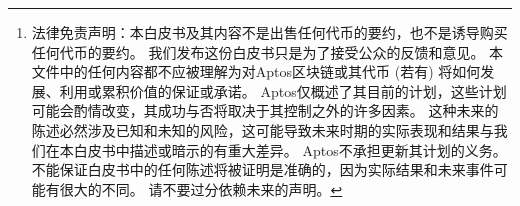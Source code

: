 \documentclass{article}
\begin{document}
\begin{abstract}
随着全新的互联网基础设施区块链的崛起，开发者正以飞快的速度部署着数以万计的去中心化应用程序。遗憾的是，由于稳定性差、成本高、低吞吐量及一些安全问题，区块链尚未被广泛应用。 为了能够在web3时代被广泛使用，区块链基础设施应该效仿云基础设施的特点，即为众多的去中心化应用提供可信，可扩展，经济高效且持续优化的平台。

为应对这些挑战，我们以可扩展、安全、可靠和可升级为核心设计原则推出\emph{Aptos 区块链}。 Aptos 区块链是在过去三年中由全球350多名开发人员开发的 \cite{aptos_core_github}。 它在共识算法、智能合约设计、系统安全、性能和去中心化方面提供了新的创新。 这些技术的结合将为把Web3带向更广泛的人群提供一个坚实的基础：

\footnote{法律免责声明：本白皮书及其内容不是出售任何代币的要约，也不是诱导购买任何代币的要约。 我们发布这份白皮书只是为了接受公众的反馈和意见。 本文件中的任何内容都不应被理解为对Aptos区块链或其代币 (若有) 将如何发展、利用或累积价值的保证或承诺。 Aptos仅概述了其目前的计划，这些计划可能会酌情改变，其成功与否将取决于其控制之外的许多因素。 这种未来的陈述必然涉及已知和未知的风险，这可能导致未来时期的实际表现和结果与我们在本白皮书中描述或暗示的有重大差异。 Aptos不承担更新其计划的义务。 不能保证白皮书中的任何陈述将被证明是准确的，因为实际结果和未来事件可能有很大的不同。 请不要过分依赖未来的声明。}
 
 \begin{itemize}
  \item 首先，Aptos 区块链原生集成并使用 \emph{Move 语言}来实现快速安全的交易执行 \cite{move_github}。 \emph{Move prover}，一个用Move 语言开发的智能合约形式化验证工具，为合约常量和运行提供额外保障。 这种注重安全的做法，可以让开发人员能够更好地保护软件，以免受恶意实体的攻击。 
  \item 其次，Aptos 数据模型允许灵活的密钥管理和混合托管选项。 这与签名前的交易透明性和实用的轻客户端协议一起，共同提供了更安全、更值得信赖的用户体验。

  \item 第三，为了实现高吞吐量和低延迟，Aptos区块链在交易处理的关键阶段使用了流水线和模块化方法。 具体而言，交易分发、区块元数据排序、并行事务执行、批量存储和账本认证等操作会同时运行。 这种做法充分利用了所有可用的硬件资源，提升了硬件效率，并实现了高度并行处理。 

  \item 第四，与需要读写前获取被读写数据而破坏交易原子性的并行执行引擎不同，Aptos 区块链没有对开发者设置这种限制。它通过保证任意复杂的交易的原子性，为真实世界的应用程序提供更高的吞吐量和更低的延迟，并简化了开发。

  \item 第五，Aptos模块化架构保证了客户端的灵活性，并针对频繁的升级进行优化。 此外，为了迅速部署新的技术创新和支持新的Web3使用案例，Aptos区块链提供了嵌入式的链上变化管理协议。

  \item 最后，Aptos区块链正在试验未来超越单个验证器性能的举措：其模块化设计和并行执行引擎支持验证者的内部分片，而同质状态分片（homogeneous state sharding）提供了水平吞吐量可扩展的潜力，而不会给节点运营商带来额外的复杂性。
\end{itemize}

\end{abstract}
\end{document}
